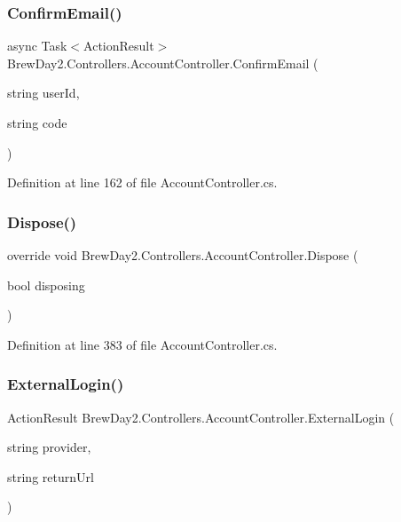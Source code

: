 \subsubsection{\texorpdfstring{Confirm\+Email()}{ConfirmEmail()}}
{\footnotesize\ttfamily async Task$<$Action\+Result$>$ Brew\+Day2.\+Controllers.\+Account\+Controller.\+Confirm\+Email (\begin{DoxyParamCaption}\item[{string}]{user\+Id,  }\item[{string}]{code }\end{DoxyParamCaption})}



Definition at line 162 of file Account\+Controller.\+cs.

\mbox{\label{class_brew_day2_1_1_controllers_1_1_account_controller_a70375e7a1aa3e246515cbfcc330df4ce}} 
\subsubsection{\texorpdfstring{Dispose()}{Dispose()}}
{\footnotesize\ttfamily override void Brew\+Day2.\+Controllers.\+Account\+Controller.\+Dispose (\begin{DoxyParamCaption}\item[{bool}]{disposing }\end{DoxyParamCaption})\hspace{0.3cm}{\ttfamily [protected]}}



Definition at line 383 of file Account\+Controller.\+cs.

\mbox{\label{class_brew_day2_1_1_controllers_1_1_account_controller_af94a683f03d5beabc0649a9c0da31384}} 
\subsubsection{\texorpdfstring{External\+Login()}{ExternalLogin()}}
{\footnotesize\ttfamily Action\+Result Brew\+Day2.\+Controllers.\+Account\+Controller.\+External\+Login (\begin{DoxyParamCaption}\item[{string}]{provider,  }\item[{string}]{return\+Url }\end{DoxyParamCaption})}



